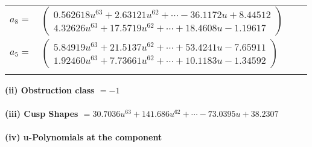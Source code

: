 \documentclass[1p]{elsarticle_modified}
\theoremstyle{definition}
\begin{document}
\begin{tabular}{m{7pt} m{180pt} m{7pt} m{180pt} }
\flushright $a_{8}=$&$\begin{pmatrix}0.562618 u^{63}+2.63121 u^{62}+\cdots-36.1172 u+8.44512\\4.32626 u^{63}+17.5719 u^{62}+\cdots+18.4608 u-1.19617\end{pmatrix}$ \\
\flushright $a_{5}=$&$\begin{pmatrix}5.84919 u^{63}+21.5137 u^{62}+\cdots+53.4241 u-7.65911\\1.92460 u^{63}+7.73661 u^{62}+\cdots+10.1183 u-1.34592\end{pmatrix}$\\&\end{tabular}
\flushleft \textbf{(ii) Obstruction class $= -1$}\\~\\
\flushleft \textbf{(iii) Cusp Shapes $= 30.7036 u^{63}+141.686 u^{62}+\cdots-73.0395 u+38.2307$}\\~\\
\newpage\renewcommand{\arraystretch}{1}
\flushleft \textbf{(iv) u-Polynomials at the component}\newline \\
\end{document}
